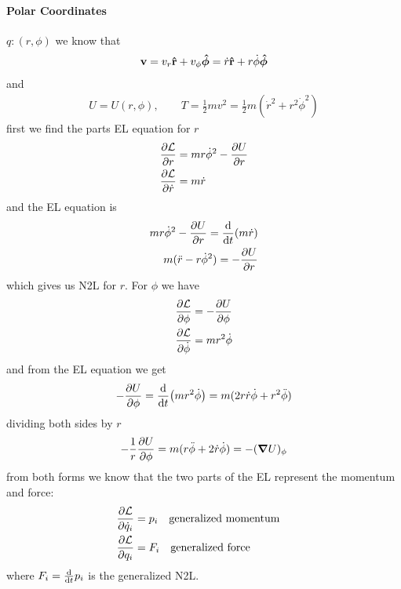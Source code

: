 \documentclass[../main.tex]{subfiles}
\begin{document}
\paragraph*{Polar Coordinates} $q: (r, \phi)$ we know that
\begin{align*}
    \vb v = v_r \vu r + v_\phi \vu* \phi = \dot r \vu r + r \dot \phi \vu* \phi
\end{align*}
and
\begin{align*}
    U = U(r, \phi), \qquad T = \frac{1}{2} m v^2 = \frac{1}{2} m (\dot r^2 + r^2 \dot \phi^2)
\end{align*}
first we find the parts EL equation for $r$
\begin{align*}
    \pdv{\mathcal{L}}{r} &= mr \dot \phi^2 - \pdv{U}{r} \\
    \pdv{\mathcal{L}}{\dot r} &= m \dot r
\end{align*}
and the EL equation is
\begin{align*}
    mr \dot \phi^2 - \pdv{U}{r} = \dv{t}(m \dot r) \\
    m(\ddot r - r \dot \phi^2) = - \pdv{U}{r}
\end{align*}
which gives us N2L for $r$. For $\phi$ we have
\begin{align*}
    \pdv{\mathcal{L}}{\phi} &= -\pdv{U}{\phi} \\
    \pdv{\mathcal{L}}{\dot \phi} &= m r^2 \dot \phi
\end{align*}
and from the EL equation we get
\begin{align*}
    -\pdv{U}{\phi} = \dv{t}(mr^2 \dot \phi ) = m(2 r \dot r \dot \phi + r^2 \ddot \phi)
\end{align*}
dividing both sides by $r$
\begin{align*}
    -\frac{1}{r} \pdv{U}{\phi} = m(r \ddot \phi + 2 \dot r \dot \phi) = -(\grad U)_\phi
\end{align*}
from both forms we know that the two parts of the EL represent the momentum and force:
\begin{align*}
    \pdv{\lagr}{\dot q_i} &= p_i \qqtext{generalized momentum} \\
    \pdv{\lagr}{q_i} &= F_i \qqtext{generalized force} 
\end{align*}
where $F_i = \dv{t} p_i$ is the generalized N2L.
\end{document}
